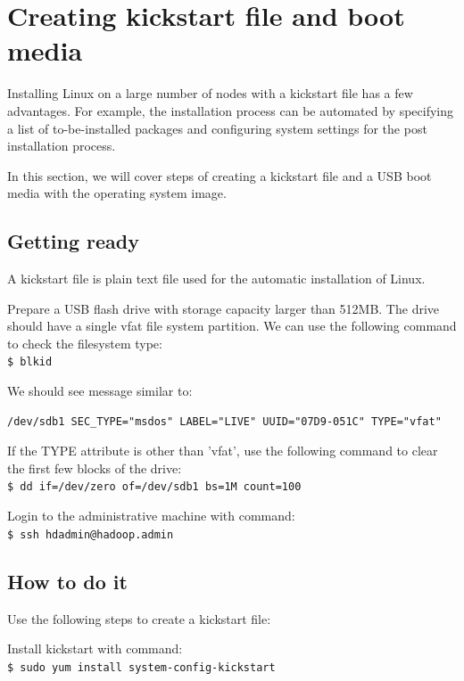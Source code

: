 \section{Creating kickstart file and boot media}
Installing Linux on a large number of nodes with a kickstart file has a few advantages. For example, the installation process can be automated by specifying a list of to-be-installed packages and configuring system settings for the post installation process.

In this section, we will cover steps of creating a kickstart file and a USB boot media with the operating system image.
\subsection*{Getting ready}
A kickstart file is plain text file used for the automatic installation of Linux.

Prepare a USB flash drive with storage capacity larger than 512MB. The drive should have a single vfat file system partition. We can use the following command to check the filesystem type: \\
\verb|$ blkid|

We should see message similar to:
\lstset{style=bashstyle}
\begin{lstlisting}
/dev/sdb1 SEC_TYPE="msdos" LABEL="LIVE" UUID="07D9-051C" TYPE="vfat"
\end{lstlisting}

If the TYPE attribute is other than 'vfat', use the following command to clear the first few blocks of the drive: \\
\verb|$ dd if=/dev/zero of=/dev/sdb1 bs=1M count=100|

Login to the administrative machine with command: \\
\verb|$ ssh hdadmin@hadoop.admin|

\subsection*{How to do it}
Use the following steps to create a kickstart file:

Install kickstart with command: \\
\verb|$ sudo yum install system-config-kickstart|

